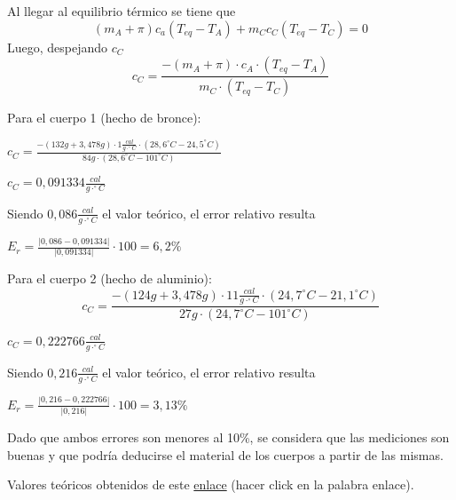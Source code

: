 \documentclass[12pt, a4paper]{article}
\begin{document}
Al llegar al equilibrio térmico se tiene que
\begin{equation}
    (m_A + \pi) c_a (T_{eq} - T_A) + m_C c_C (T_{eq} - T_C) = 0
\end{equation}
Luego, despejando $c_C$
\begin{equation}
    c_C = \frac{ - (m_A + \pi) \cdot c_A \cdot (T_{eq} - T_A) }{ m_C \cdot (T_{eq} - T_C) }
\end{equation}

Para el cuerpo 1 (hecho de bronce):
\begin{center}
    $ c_C = \frac{ - (132g + 3,478g) \cdot 1 \frac{cal}{g \cdot ^\circ C} \cdot (28,6^\circ C - 24,5^\circ C) }{ 84g \cdot (28,6^\circ C - 101^\circ C) } $
\end{center}
\begin{center}
    $ c_C = 0,091334 \frac{cal}{g \cdot ^\circ C} $
\end{center}

Siendo $ 0,086 \frac{cal}{g \cdot ^\circ C} $ el valor teórico, el error relativo resulta
\begin{center}
    $ E_r =  \frac{|0,086-0,091334|}{|0,091334|}\cdot 100 = 6,2 \% $
\end{center}

Para el cuerpo 2 (hecho de aluminio):
\begin{equation}
    c_C = \frac{ - (124g + 3,478g) \cdot 11 \frac{cal}{g \cdot ^\circ C} \cdot (24,7^\circ C - 21,1^\circ C) }{ 27g \cdot (24,7^\circ C - 101^\circ C) }
\end{equation}
\begin{center}
    $ c_C = 0,222766 \frac{cal}{g \cdot ^\circ C} $
\end{center}
Siendo $ 0,216 \frac{cal}{g \cdot ^\circ C} $ el valor teórico, el error relativo resulta
\begin{center}
    $ E_r =  \frac{|0,216-0,222766|}{|0,216|}\cdot 100 = 3,13 \% $
\end{center}

Dado que ambos errores son menores al 10\%, se considera que las mediciones son buenas y que podría deducirse el material de los cuerpos a partir de las mismas.

 
Valores teóricos obtenidos de este \href{https://www.educamix.com/educacion/3_eso_materiales/prof/bloque_ii/tablas_d_te_tf_internet.pdf}{enlace} (hacer click en la palabra enlace).
\end{document}
